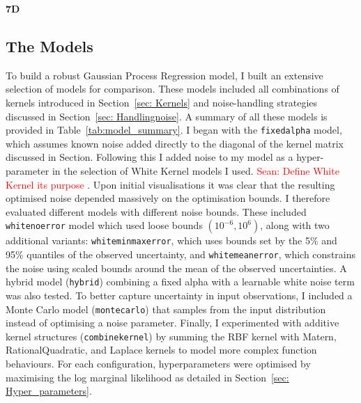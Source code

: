 \documentclass[11pt]{article}
\newcommand{\Sean}[1]{{\textcolor{red}{{Sean: #1}} }}
\begin{document}
\noindent
\textbf{7D}

\subsection{The Models}
To build a robust Gaussian Process Regression model, I built an extensive selection of models for comparison.
These models included all combinations of kernels introduced in Section~\ref{sec: Kernels} and noise-handling strategies discussed in Section~\ref{sec: Handlingnoise}. 
A summary of all these models is provided in Table~\ref{tab:model_summary}. I began with the \texttt{fixedalpha} model, which assumes known noise added directly to the diagonal of the kernel matrix discussed in Section.
Following this I added noise to my model as a hyper-parameter in the selection of White Kernel models I used. \Sean{Define White Kernel its purpose}. Upon initial visualisations it was clear that the resulting optimised noise depended massively on the optimisation bounds. I therefore evaluated different models with different noise bounds. These included
\texttt{whitenoerror} model which used loose bounds \((10^{-6}, 10^6)\), along with two additional variants: \texttt{whiteminmaxerror}, which uses bounds set by the 5\% and 95\% quantiles of the observed uncertainty, and \texttt{whitemeanerror}, which constrains the noise using scaled bounds around the mean of the observed uncertainties. 
A hybrid model (\texttt{hybrid}) combining a fixed alpha with a learnable white noise term was also tested. To better capture uncertainty in input observations, I included a Monte Carlo model (\texttt{montecarlo}) that samples from the input distribution instead of optimising a noise parameter.
Finally, I experimented with additive kernel structures (\texttt{combinekernel}) by summing the RBF kernel with Matern, RationalQuadratic, and Laplace kernels to model more complex function behaviours. For each configuration, hyperparameters were optimised by maximising the log marginal likelihood as detailed in Section~\ref{sec: Hyper_parameters}.
\end{document}
